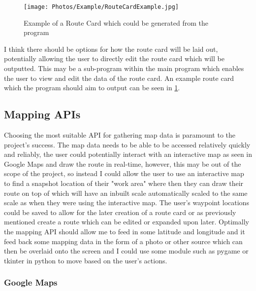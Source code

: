 \documentclass{article}
\begin{document}
        \begin{figure}[ht]
            \centering
            \texttt{[image: Photos/Example/RouteCardExample.jpg]}
            \caption{Example of a Route Card which could be generated from the program}
            \label{fig:example_route_card}
         \end{figure}
         
         I think there should be options for how the route card will be laid out, potentially allowing the user to directly edit the route card which will be outputted. This may be a sub-program within the main program which enables the user to view and edit the data of the route card. An example route card which the program should aim to output can be seen in \cref{fig:example_route_card}.

    \subsection{Mapping APIs}

        Choosing the most suitable API for gathering map data is paramount to the project's success. The map data needs to be able to be accessed relatively quickly and reliably, the user could potentially interact with an interactive map as seen in Google Maps and draw the route in real-time, however, this may be out of the scope of the project, so instead I could allow the user to use an interactive map to find a snapshot location of their "work area" where then they can draw their route on top of which will have an inbuilt scale automatically scaled to the same scale as when they were using the interactive map. The user's waypoint locations could be saved to allow for the later creation of a route card or as previously mentioned create a route which can be edited or expanded upon later. Optimally the mapping API should allow me to feed in some latitude and longitude and it feed back some mapping data in the form of a photo or other source which can then be overlaid onto the screen and I could use some module such as pygame or tkinter in python to move based on the user's actions.

        \subsubsection{Google Maps}
\end{document}
